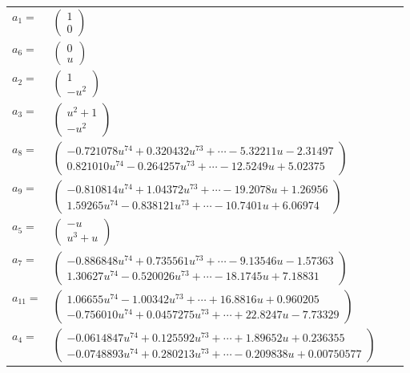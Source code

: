 \documentclass[1p]{elsarticle_modified}
\theoremstyle{definition}
\begin{document}
\begin{tabular}{m{7pt} m{180pt} m{7pt} m{180pt} }
\flushright $a_{1}=$&$\begin{pmatrix}1\\0\end{pmatrix}$ \\
\flushright $a_{6}=$&$\begin{pmatrix}0\\u\end{pmatrix}$ \\
\flushright $a_{2}=$&$\begin{pmatrix}1\\- u^2\end{pmatrix}$ \\
\flushright $a_{3}=$&$\begin{pmatrix}u^2+1\\- u^2\end{pmatrix}$ \\
\flushright $a_{8}=$&$\begin{pmatrix}-0.721078 u^{74}+0.320432 u^{73}+\cdots-5.32211 u-2.31497\\0.821010 u^{74}-0.264257 u^{73}+\cdots-12.5249 u+5.02375\end{pmatrix}$ \\
\flushright $a_{9}=$&$\begin{pmatrix}-0.810814 u^{74}+1.04372 u^{73}+\cdots-19.2078 u+1.26956\\1.59265 u^{74}-0.838121 u^{73}+\cdots-10.7401 u+6.06974\end{pmatrix}$ \\
\flushright $a_{5}=$&$\begin{pmatrix}- u\\u^3+u\end{pmatrix}$ \\
\flushright $a_{7}=$&$\begin{pmatrix}-0.886848 u^{74}+0.735561 u^{73}+\cdots-9.13546 u-1.57363\\1.30627 u^{74}-0.520026 u^{73}+\cdots-18.1745 u+7.18831\end{pmatrix}$ \\
\flushright $a_{11}=$&$\begin{pmatrix}1.06655 u^{74}-1.00342 u^{73}+\cdots+16.8816 u+0.960205\\-0.756010 u^{74}+0.0457275 u^{73}+\cdots+22.8247 u-7.73329\end{pmatrix}$ \\
\flushright $a_{4}=$&$\begin{pmatrix}-0.0614847 u^{74}+0.125592 u^{73}+\cdots+1.89652 u+0.236355\\-0.0748893 u^{74}+0.280213 u^{73}+\cdots-0.209838 u+0.00750577\end{pmatrix}$ \\

\end{tabular}
\end{document}

